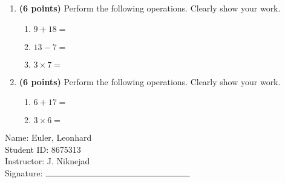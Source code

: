 \documentclass[12pt]{amsart}
\begin{document}
\newpage
\begin{enumerate}
\item {\bf (6 points)} 
 Perform the following operations. Clearly show your work. \begin{enumerate}


\def \a{9}\def \b{18}\def \apb{27}

 
\item $\a + \b = $

\vspace{2cm}
\def \a{13}\def \dif{6}\def \b{7}

 
\item $\a - \b = $

\vspace{2cm}
\def \a{3}\def \b{7}\def \ab{10}

 
\item $\a \times \b = $ 

\vspace{2cm}
\def \vshift{-1}\def \hshift{4}\def \chang{0}\def \findval{4}\def \yval{-1}

 
\end{enumerate}


\newpage
\item {\bf (6 points)} 
 Perform the following operations. Clearly show your work. \begin{enumerate}


\def \a{6}\def \b{17}\def \apb{23}

 
\item $\a + \b = $

\vspace{2cm}
\def \a{3}\def \b{6}\def \ab{9}

 
\item $\a \times \b = $ 

\vspace{2cm}
\def \vshift{-1}\def \hshift{4}\def \chang{-2}\def \findval{2}\def \yval{3}

 
\end{enumerate}


\newpage\end{enumerate}\graphicspath{{/Users/jilan/Downloads/Randomizer/Randomizer/Sample Course/Sample Assessment 2/}}\setcounter{page}{1}


\thispagestyle{fancy}

 \noindent Name: Euler, Leonhard \vspace{.3cm} \\\noindent Student ID: 8675313 \vspace{.3cm} \\\noindent Instructor: J. Niknejad \vspace{.3cm} \\\noindent Signature: $\rule{6cm}{0.15mm}$ \vspace{.3cm} \\ 
\end{document}
